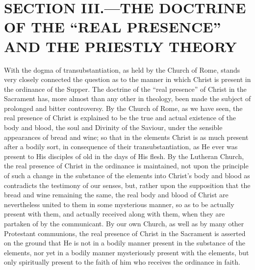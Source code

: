 \documentclass[]{book}
\begin{document}
\hypertarget{section-iii.the-doctrine-of-the-real-presence-and-the-priestly-theory}{%
\section{SECTION III.---THE DOCTRINE OF THE ``REAL PRESENCE'' AND THE PRIESTLY THEORY}\label{section-iii.the-doctrine-of-the-real-presence-and-the-priestly-theory}}

With the dogma of transubstantiation, as held by the Church of Rome, stands very closely connected the question as to the manner in which Christ is present in the ordinance of the Supper. The doctrine of the ``real presence'' of Christ in the Sacrament has, more almost than any other in theology, been made the subject of prolonged and bitter controversy. By the Church of Rome, as we have seen, the real presence of Christ is explained to be the true and actual existence of the body and blood, the soul and Divinity of the Saviour, under the sensible appearances of bread and wine; so that in the elements Christ is as much present after a bodily sort, in consequence of their transubstantiation, as He ever was present to His disciples of old in the days of His flesh. By the Lutheran Church, the real presence of Christ in the ordinance is maintained, not upon the principle of such a change in the substance of the elements into Christ's body and blood as contradicts the testimony of our senses, but, rather upon the supposition that the bread and wine remaining the same, the real body and blood of Christ are nevertheless united to them in some mysterious manner, so as to be actually present with them, and actually received along with them, when they are partaken of by the communicant. By our own Church, as well as by many other Protestant communions, the real presence of Christ in the Sacrament is asserted on the ground that He is not in a bodily manner present in the substance of the elements, nor yet in a bodily manner mysteriously present with the elements, but only spiritually present to the faith of him who receives the ordinance in faith.
\end{document}
